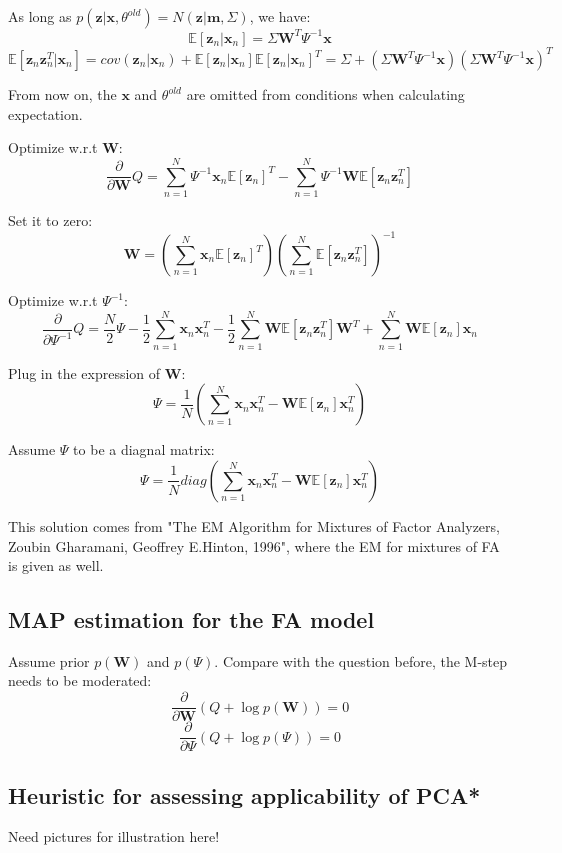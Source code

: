 \documentclass[UTF8]{ctexart}
\begin{document}
As long as $p(\textbf{z}|\textbf{x},\theta^{old})=N(\textbf{z}|\textbf{m},\Sigma)$, we have:
$$\mathbb{E}[\textbf{z}_{n}|\textbf{x}_{n}]=\Sigma\textbf{W}^{T}\Psi^{-1}\textbf{x}$$
$$\mathbb{E}[\textbf{z}_{n}\textbf{z}_{n}^{T}|\textbf{x}_{n}]=cov(\textbf{z}_{n}|\textbf{x}_{n})+\mathbb{E}[\textbf{z}_{n}|\textbf{x}_{n}]\mathbb{E}[\textbf{z}_{n}|\textbf{x}_{n}]^{T}=\Sigma + (\Sigma\textbf{W}^{T}\Psi^{-1}\textbf{x})(\Sigma\textbf{W}^{T}\Psi^{-1}\textbf{x})^{T}$$

From now on, the $\textbf{x}$ and $\theta^{old}$ are omitted from conditions when calculating expectation.

Optimize w.r.t $\textbf{W}$:
$$\frac{\partial}{\partial \textbf{W}}Q=\sum_{n=1}^{N}\Psi^{-1}\textbf{x}_{n}\mathbb{E}[\textbf{z}_{n}]^{T}-\sum_{n=1}^{N}\Psi^{-1}\textbf{W}\mathbb{E}[\textbf{z}_{n}\textbf{z}_{n}^{T}]$$

Set it to zero:
$$\textbf{W}=(\sum_{n=1}^{N}\textbf{x}_{n}\mathbb{E}[\textbf{z}_{n}]^{T})(\sum_{n=1}^{N}\mathbb{E}[\textbf{z}_{n}\textbf{z}_{n}^{T}])^{-1}$$

Optimize w.r.t $\Psi^{-1}$:
$$\frac{\partial}{\partial \Psi^{-1}}Q=\frac{N}{2}\Psi -\frac{1}{2}\sum_{n=1}^{N}\textbf{x}_{n}\textbf{x}_{n}^{T}-\frac{1}{2}\sum_{n=1}^{N}\textbf{W}\mathbb{E}[\textbf{z}_{n}\textbf{z}_{n}^{T}]\textbf{W}^{T}+\sum_{n=1}^{N}\textbf{W}\mathbb{E}[\textbf{z}_{n}]\textbf{x}_{n}$$

Plug in the expression of $\textbf{W}$:
$$\Psi=\frac{1}{N}(\sum_{n=1}^{N}\textbf{x}_{n}\textbf{x}_{n}^{T}-\textbf{W}\mathbb{E}[\textbf{z}_{n}]\textbf{x}_{n}^{T})$$

Assume $\Psi$ to be a diagnal matrix:
$$\Psi=\frac{1}{N}diag(\sum_{n=1}^{N}\textbf{x}_{n}\textbf{x}_{n}^{T}-\textbf{W}\mathbb{E}[\textbf{z}_{n}]\textbf{x}_{n}^{T})$$

This solution comes from "The EM Algorithm for Mixtures of Factor Analyzers, Zoubin Gharamani, Geoffrey E.Hinton, 1996", where the EM for mixtures of FA is given as well.

\subsection{MAP estimation for the FA model}
Assume prior $p(\textbf{W})$ and $p(\Psi)$. Compare with the question before, the M-step needs to be moderated:
$$\frac{\partial}{\partial \textbf{W}}(Q+\log p(\textbf{W}))=0$$
$$\frac{\partial}{\partial \Psi}(Q+\log p(\Psi))=0$$

\subsection{Heuristic for assessing applicability of PCA*}
Need pictures for illustration here!
\end{document}
